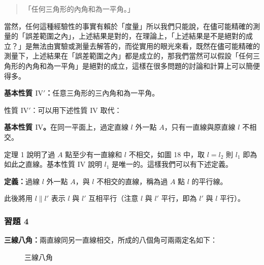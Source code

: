\begin{quote}
  「任何三角形的內角和為一平角。」
\end{quote}
當然，任何這種經驗性的事實有賴於「度量」所以我們只能說，在儘可能精確的測量的「誤差範圍之內」，上述結果是對的，在理論上，「上述結果是不是絕對的成立？」是無法由實驗或測量去解答的，而從實用的眼光來看，既然在儘可能精確的測量下，上述結果在「誤差範圍之內」都是成立的，那我們當然可以假設「任何三角形的內角和為一平角」是絕對的成立，這樣在很多問題的討論和計算上可以簡便得多。

\noindent\textbf{基本性質 $\mathrm{IV}'$：}任意三角形的三內角和為一平角。

\noindent 性質 $\mathrm{IV}'$：可以用下述性質 $\mathrm{IV}$ 取代：

\noindent\textbf{基本性質 $\mathrm{IV}$。}在同一平面上，過定直線 $l$ 外一點 $A$，只有一直線與原直線 $l$ 不相交。

定理 1 說明了過 $A$ 點至少有一直線和 $l$ 不相交，如圖 18 中，取 $l = l_2$ 則 $l_1$ 即為如此之直線。基本性質 $\mathrm{IV}$ 說明 $l_1$ 是唯一的。這樣我們可以有下述定義。

\noindent\textbf{定義：}過線 $l$ 外一點 $A$，與 $l$ 不相交的直線，稱為過 $A$ 點 $l$ 的平行線。

此後將用 $l \parallel l'$ 表示 $l$ 與 $l'$ 互相平行（注意 $l$ 與 $l'$ 平行，即為 $l'$ 與 $l$ 平行）。

\subsubsection*{習題 4}

\noindent\textbf{三線八角：}兩直線同另一直線相交，所成的八個角可兩兩定名如下：

\begin{figure}[H]
\centering
{}
\caption{三線八角}
\label{fig:b3s-a1-21}
\end{figure}

